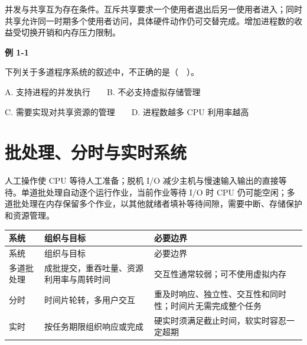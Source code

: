 并发与共享互为存在条件。互斥共享要求一个使用者退出后另一使用者进入；同时共享允许同一时期多个使用者访问，具体硬件动作仍可交替完成。增加进程数的收益受切换开销和内存压力限制。

\par\medskip{}\noindent\hypertarget{OS01-E01}{}\label{OS01-E01}\textbf{例 1-1}\par\nobreak\smallskip

下列关于多道程序系统的叙述中，不正确的是（　）。

A. 支持进程的并发执行　　B. 不必支持虚拟存储管理

C. 需要实现对共享资源的管理　　D. 进程数越多 CPU 利用率越高

\section{批处理、分时与实时系统}\label{OS01-systems}

人工操作使 CPU 等待人工准备；脱机 I/O 减少主机与慢速输入输出的直接等待。单道批处理自动逐个运行作业，当前作业等待 I/O 时 CPU 仍可能空闲；多道批处理在内存保留多个作业，以其他就绪者填补等待间隙，需要中断、存储保护和资源管理。

\par\smallskip
\begin{wideblock}
{\fontsize{9.3}{12}\selectfont\setlength{\tabcolsep}{2.5pt}\setlength{\LTleft}{0pt}\setlength{\LTright}{0pt}
\begin{longtable}{@{}>{\raggedright\arraybackslash}p{}>{\raggedright\arraybackslash}p{}>{\raggedright\arraybackslash}p{}@{}}
\toprule
系统 & 组织与目标 & 必要边界 \\

\midrule\endfirsthead\toprule
系统 & 组织与目标 & 必要边界 \\

\midrule\endhead\bottomrule\endfoot
多道批处理 & 成批提交，重吞吐量、资源利用率与周转时间 & 交互性通常较弱；可不使用虚拟内存 \\

分时 & 时间片轮转，多用户交互 & 重及时响应、独立性、交互性和同时性；时间片无需完成整个任务 \\

实时 & 按任务期限组织响应或完成 & 硬实时须满足截止时间，软实时容忍一定超期 \\

\end{longtable}}
\end{wideblock}
\par\smallskip

